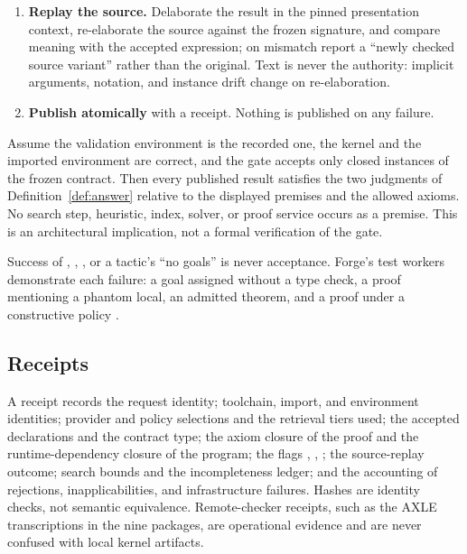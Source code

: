 \begin{enumerate}
\item \textbf{Replay the source.} Delaborate the result in the pinned presentation context, re-elaborate the source against the frozen signature, and compare meaning with the accepted expression; on mismatch report a ``newly checked source variant'' rather than the original. Text is never the authority: implicit arguments, notation, and instance drift change on re-elaboration.
\item \textbf{Publish atomically} with a receipt. Nothing is published on any failure.
\end{enumerate}

\begin{theorem}\label{thm:soundness}
Assume the validation environment is the recorded one, the kernel and the imported environment are correct, and the gate accepts only closed instances of the frozen contract. Then every published  result satisfies the two judgments of Definition~\ref{def:answer} relative to the displayed premises and the allowed axioms. No search step, heuristic, index, solver, or proof service occurs as a premise. This is an architectural implication, not a formal verification of the gate.
\end{theorem}

\begin{invariant}
Success of , , , or a tactic's ``no goals'' is never acceptance. Forge's test workers demonstrate each failure: a goal assigned  without a type check, a proof mentioning a phantom local, an admitted theorem, and a  proof under a constructive policy \cite{forge}.
\end{invariant}

\subsection{Receipts}

A receipt records the request identity; toolchain, import, and environment identities; provider and policy selections and the retrieval tiers used; the accepted declarations and the contract type; the axiom closure of the proof and the runtime-dependency closure of the program; the flags , , ; the source-replay outcome; search bounds and the incompleteness ledger; and the accounting of rejections, inapplicabilities, and infrastructure failures. Hashes are identity checks, not semantic equivalence. Remote-checker receipts, such as the AXLE transcriptions in the nine packages, are operational evidence and are never confused with local kernel artifacts.

